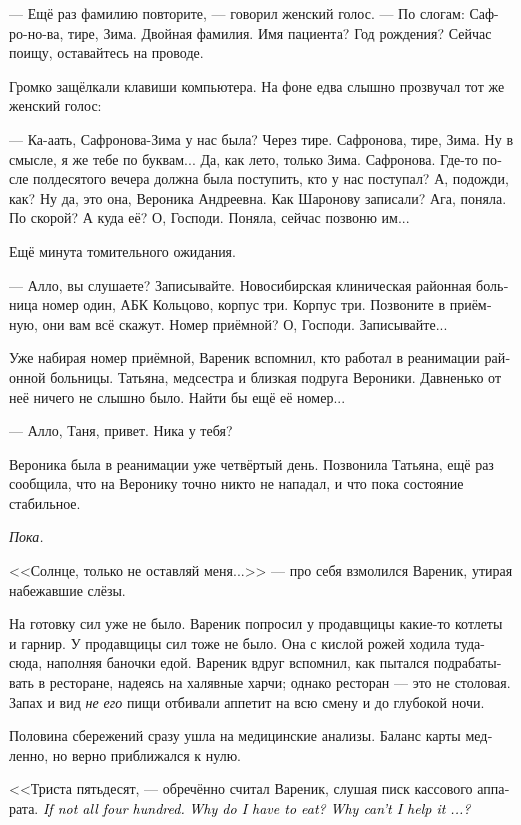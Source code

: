 \documentclass[a5paper,12pt,fleqn]{extbook}\usepackage{cooltooltips}\usepackage{polyglossia}\setdefaultlanguage[babelshorthands=true]{russian}\setotherlanguage{english}\defaultfontfeatures{Ligatures=TeX,Mapping=tex-text} \usepackage{xcolor}\definecolor{lightgray}{HTML}{bbbbbb}\color{lightgray}\newcommand{\ml}[3]{\textenglish{\textcolor{black}{#3}}}
\newcommand{\asterism}{\vspace{1em}{\centering\Large\bfseries$\ast~\ast~\ast$\par}\vspace{1em}}
\newcommand{\textspace}{\vspace{1em}{\centering\Large\bfseries<...>\par}\vspace{1em}}
\begin{document}
--- Ещё раз фамилию повторите, --- говорил женский голос.
--- По слогам: Саф-ро-но-ва, тире, Зима.
Двойная фамилия.
Имя пациента?
Год рождения?
Сейчас поищу, оставайтесь на проводе.

Громко защёлкали клавиши компьютера.
На фоне едва слышно прозвучал тот же женский голос:

--- Ка-аать, Сафронова-Зима у нас была?
Через тире.
Сафронова, тире, Зима.
Ну в смысле, я же тебе по буквам...
Да, как лето, только Зима.
Сафронова.
Где-то после полдесятого вечера должна была поступить, кто у нас поступал?
А, подожди, как?
Ну да, это она, Вероника Андреевна.
Как Шаронову записали?
Ага, поняла.
По скорой?
А куда её?
О, Господи.
Поняла, сейчас позвоню им...

Ещё минута томительного ожидания.

--- Алло, вы слушаете?
Записывайте.
Новосибирская клиническая районная больница номер один, АБК Кольцово, корпус три.
Корпус три.
Позвоните в приёмную, они вам всё скажут.
Номер приёмной?
О, Господи.
Записывайте...

Уже набирая номер приёмной, Вареник вспомнил, кто работал в реанимации районной больницы.
Татьяна, медсестра и близкая подруга Вероники.
Давненько от неё ничего не слышно было.
Найти бы ещё её номер...

--- Алло, Таня, привет.
Ника у тебя?

\asterism

\textspace

Вероника была в реанимации уже четвёртый день.
Позвонила Татьяна, ещё раз сообщила, что на Веронику точно никто не нападал, и что пока состояние стабильное.

\emph{Пока.}

<<Солнце, только не оставляй меня...>> --- про себя взмолился Вареник, утирая набежавшие слёзы.

На готовку сил уже не было.
Вареник попросил у продавщицы какие-то котлеты и гарнир.
У продавщицы сил тоже не было.
Она с кислой рожей ходила туда-сюда, наполняя баночки едой.
Вареник вдруг вспомнил, как пытался подрабатывать в ресторане, надеясь на халявные харчи;
однако ресторан --- это не столовая.
Запах и вид \emph{не его} пищи отбивали аппетит на всю смену и до глубокой ночи.

Половина сбережений сразу ушла на медицинские анализы.
Баланс карты медленно, но верно приближался к нулю.

<<Триста пятьдесят, --- обречённо считал Вареник, слушая писк кассового аппарата.
\ml{$0$}
{--- А то и все четыреста.}
{\textit{If not all four hundred.}}
\ml{$0$}
{Почему я должен есть?}
{\textit{Why do I have to eat?}}
\ml{$0$}
{Почему я не могу не есть?..>>}
{\textit{Why can't I help it ...?}}
\end{document}
